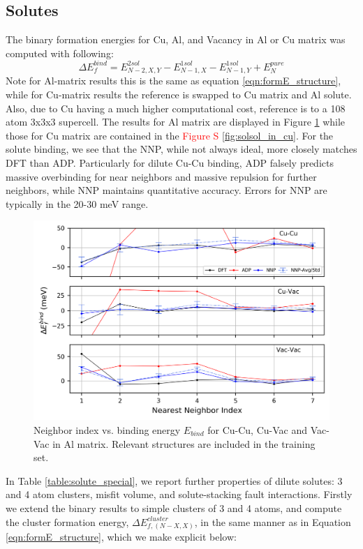 \documentclass{article}
\begin{document}
\subsection{Solutes} \label{sct:solute_results}
The binary formation energies for Cu, Al, and Vacancy in Al or Cu matrix was computed with following:
\begin{equation}
\Delta E^{bind}_f = E^{2sol}_{N-2,X,Y}-E^{1sol}_{N-1,X}-E^{1sol}_{N-1,Y}+E^{pure}_N
\end{equation}
Note for Al-matrix results this is the same as equation \ref{eqn:formE_structure}, while for 
Cu-matrix results the reference is swapped to Cu matrix and Al solute.
Also, due to Cu having a much higher computational cost, reference is to a 108 atom 3x3x3 supercell.
The results for Al matrix are displayed in Figure \ref{fig:solsol_in_al} while those for Cu matrix are contained in the \textcolor{red}{Figure S \ref{fig:solsol_in_cu}}.
For the solute binding, we see that the NNP, while not always ideal, more closely matches DFT than ADP.
Particularly for dilute Cu-Cu binding, ADP falsely predicts massive overbinding for near neighbors and massive repulsion for further neighbors, while NNP maintains quantitative accuracy.
Errors for NNP are typically in the 20-30 meV range.


\begin{figure}[H]%
\centering%
\includegraphics[width=1\textwidth,center]{./figures/solsol_in_al.png}%
\caption{Neighbor index vs. binding energy $E_{bind}$ for Cu-Cu, Cu-Vac and Vac-Vac in Al matrix. 
Relevant structures are included in the training set.}%
\label{fig:solsol_in_al}
\end{figure}


In Table \ref{table:solute_special}, we report further properties of dilute solutes: 3 and 4 atom clusters, misfit volume, and solute-stacking fault interactions.
Firstly we extend the binary results to simple clusters of 3 and 4 atoms, and compute the cluster formation energy, $\Delta E^{cluster}_{f,(N-X,X)}$,
in the same manner as in Equation \ref{eqn:formE_structure}, which we make explicit below:
\end{document}
